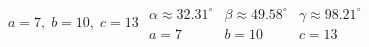 { $a = 7, \; b = 10, \; c = 13$ \label{firstherons}}
{ $\begin{array}{lll}\alpha \approx 32.31^{\circ} & \beta \approx 49.58^{\circ} & \gamma \approx 98.21^{\circ} \\a = 7 & b = 10 & c = 13 \end{array}$}
